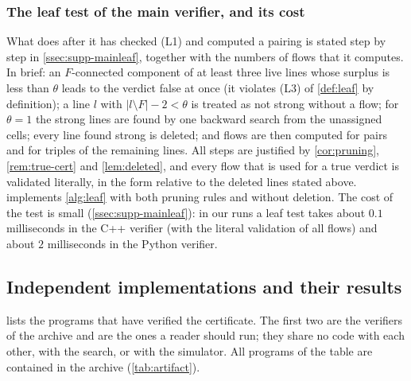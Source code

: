 \subsubsection*{The leaf test of the main verifier, and its cost}
What  does after it has checked (L1) and computed a pairing is stated step by
step in \cref{ssec:supp-mainleaf}, together with the numbers of flows that it computes. In brief: an
$F$-connected component of at least three live lines whose surplus is less than $\theta$ leads to the
verdict false at once (it violates (L3) of \cref{def:leaf} by definition); a line $l$ with $|l\setminus F|-2<\theta$ is treated as
not strong without a flow; for $\theta=1$ the strong lines are found by one backward search from the
unassigned cells; every line found strong is deleted; and flows are then computed for pairs and for
triples of the remaining lines. All steps are justified by \cref{cor:pruning}, \cref{rem:true-cert} and
\cref{lem:deleted}, and every flow that is used for a true verdict is validated literally, in the form
relative to the deleted lines stated above.  implements \cref{alg:leaf} with both
pruning rules and without deletion. The cost of the test is small (\cref{ssec:supp-mainleaf}): in our
runs a leaf test takes about
$0.1$ milliseconds in the C++ verifier (with the literal validation of all flows) and about $2$
milliseconds in the Python verifier.

\subsection{Independent implementations and their results}\label{ssec:impl}

 lists the programs that have verified the certificate. The first two are the
verifiers of the archive and are the ones a reader should run; they share no code with each other, with
the search, or with the simulator. All programs of the table are contained in the archive
(\cref{tab:artifact}).

